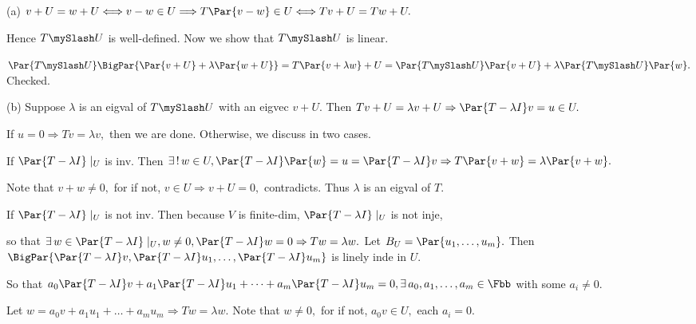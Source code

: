 \par\quad
(a) $v+U=w+U\Longleftrightarrow v-w\in U\Longrightarrow T\Par{v-w}\in U\Longleftrightarrow Tv+U=Tw+U.$\par\quad\Ha
Hence $T\mySlash U$ is well-defined. Now we show that $T\mySlash U$ is linear.\par\quad\Ha
$\Par{T\mySlash U}\BigPar{\Par{v+U}+\lambda\Par{w+U}}=T\Par{v+\lambda w}+U=\Par{T\mySlash U}\Par{v+U}+\lambda\Par{T\mySlash U}\Par{w}.$ Checked.\vspace{4pt}\par\quad
(b) Suppose $\lambda$ is an eigval of $T\mySlash U$ with an eigvec $v+U.$ Then $Tv+U=\lambda v+U\Rightarrow \Par{T-\lambda I}v=u\in U.$\par\quad\Hb
If $u=0\Rightarrow Tv=\lambda v,$ then we are done. Otherwise, we discuss in two cases.\par\quad\Hb
If $\Par{T-\lambda I}\mid_U$ is inv. Then $\exists\,!\,w\in U,\Par{T-\lambda I}\Par{w}=u=\Par{T-\lambda I} v\Rightarrow T\Par{v+w}=\lambda\Par{v+w}.$\par\quad\Hb
Note that $v+w\neq 0,$ for if not, $v\in U\Rightarrow v+U=0,$ contradicts. Thus $\lambda$ is an eigval of $T.$\par\quad\Hb
If $\Par{T-\lambda I}\mid_U$ is not inv. Then because $V$ is finite-dim, $\Par{T-\lambda I}\mid_U$ is not inje,\par\quad\Hb
so that $\exists\,w\in\null\Par{T-\lambda I}\mid_U,w\neq 0,\Par{T-\lambda I}w=0\Rightarrow Tw=\lambda w.$
\PfEnd\vspace{6pt}\quad\Hb
\Or Let $B_U=\Par{u_1,\dots,u_m}.$ Then $\BigPar{\Par{T-\lambda I}v,\Par{T-\lambda I}u_1,\dots,\Par{T-\lambda I}u_m}$ is linely inde in $U.$\par\quad\Hb
So that $a_0\Par{T-\lambda I}v+a_1\Par{T-\lambda I}u_1+\dots+a_m\Par{T-\lambda I}u_m=0,\exists\,a_0,a_1,\dots,a_m\in\Fbb$ with some $a_i\neq 0.$\par\quad\Hb
Let $w=a_0v+a_1u_1+\dots+a_mu_m\Longrightarrow Tw=\lambda w.$ Note that $w\neq 0,$ for if not, $a_0v\in U,$ each $a_i=0.$\PfEnd
\SepLine

